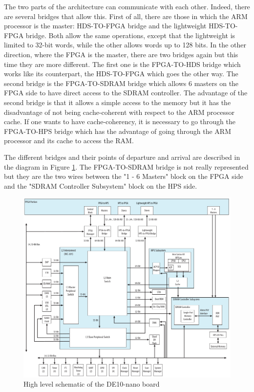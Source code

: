 \documentclass[12pt]{article}
\begin{document}
The two parts of the architecture can communicate with each other. Indeed, there are several bridges that allow this. First of all, there are those in which the ARM processor is the master: HDS-TO-FPGA bridge and the lightweight HDS-TO-FPGA bridge. Both allow the same operations, except that the lightweight is limited to 32-bit words, while the other allows words up to 128 bits. In the other direction, where the FPGA is the master, there are two bridges again but this time they are more different. The first one is the FPGA-TO-HDS bridge which works like its counterpart, the HDS-TO-FPGA which goes the other way. The second bridge is the FPGA-TO-SDRAM bridge which allows 6 masters on the FPGA side to have direct access to the SDRAM controller. The advantage of the second bridge is that it allows a simple access to the memory but it has the disadvantage of not being cache-coherent with respect to the ARM processor cache. If one wants to have cache-coherency, it is necessary to go through the FPGA-TO-HPS bridge which has the advantage of going through the ARM processor and its cache to access the RAM.

\vspace{12pt}
The different bridges and their points of departure and arrival are described in the diagram in Figure \ref{fig:de10nano_schematic}. The FPGA-TO-SDRAM bridge is not really represented but they are the two wires between the "1 - 6 Masters" block on the FPGA side and the "SDRAM Controller Subsystem" block on the HPS side.

\begin{figure}[ht!]
  \center
  \includegraphics[width=12cm]{"res/chapter1/board_schematic.png"}
  \caption{High level schematic of the DE10-nano board}
  \label{fig:de10nano_schematic}
\end{figure}
\end{document}
